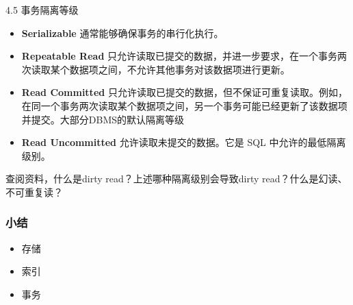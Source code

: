 \documentclass[aspectratio=169, 14pt]{beamer}
\begin{document}
\begin{frame}[fragile]{4.5 事务隔离等级}
	\begin{itemize}
		\item \textbf{Serializable} 通常能够确保事务的串行化执行。

		\item \textbf{Repeatable Read} 只允许读取已提交的数据，并进一步要求，在一个事务两次读取某个数据项之间，不允许其他事务对该数据项进行更新。
	\end{itemize}
\end{frame}

\begin{frame}
	\begin{itemize}
		\item \textbf{Read Committed} 只允许读取已提交的数据，但不保证可重复读取。例如，在同一个事务两次读取某个数据项之间，另一个事务可能已经更新了该数据项并提交。\alert{大部分DBMS的默认隔离等级}

		\item \textbf{Read Uncommitted} 允许读取未提交的数据。它是 SQL 中允许的最低隔离级别。
	\end{itemize}

	查阅资料，什么是\alert{dirty read}？上述哪种隔离级别会导致\alert{dirty read}？什么是\alert{幻读}、\alert{不可重复读}？
\end{frame}

\begin{frame}
	\frametitle{小结}

	\begin{itemize}
		\item 存储
		\item 索引
		\item 事务
	\end{itemize}

\end{frame}
\end{document}
